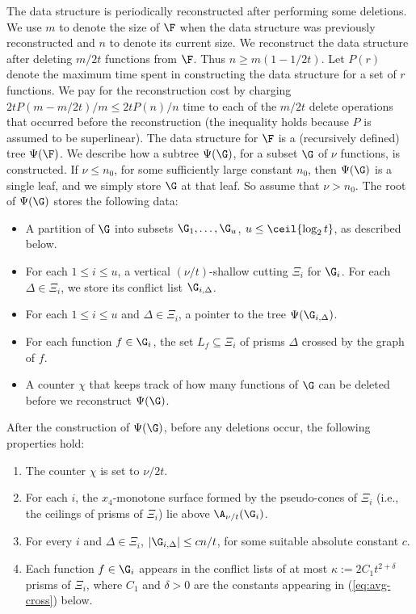 The data structure is periodically reconstructed after performing some deletions. We use 
$m$ to denote the size of $\F$ when the data structure was previously reconstructed and $n$ 
to denote its current size. We reconstruct the data structure after deleting $m/2t$ functions 
from $\F$. Thus $n \ge m(1-1/2t)$. Let $P(r)$ denote the maximum time spent in constructing the 
data structure for a set of $r$ functions. We pay for the reconstruction cost by charging 
$2tP(m-m/2t)/m \le 2tP(n)/n$ time to each of the $m/2t$ delete operations that occurred 
before the reconstruction (the inequality holds because $P$ is assumed to be superlinear). 
The data structure for $\F$ is a (recursively defined) tree $\Psi(\F)$. We describe how a 
subtree $\Psi(\G)$, for a subset $\G$ of $\nu$ functions, is constructed.
%
If $\nu \le n_0$, for some sufficiently large constant $n_0$, then $\Psi(\G)$ is a single
leaf, and we simply store $\G$ at that leaf. So assume that $\nu > n_0$. The root of $\Psi(\G)$ 
stores the following data:
%
\medskip
\begin{itemize}
	\item A partition of $\G$ into subsets $\G_1, \ldots, \G_u$, $u \le \ceil{\log_2 t}$, 
as described below.
	\item For each $1 \le i \le u$, a vertical $(\nu/t)$-shallow cutting 
$\Xi_i$ for $\G_i$. 
For each $\Delta \in \Xi_i$, we store its conflict list $\G_{i,\Delta}$.
	\item For each $1 \le i \le u$ and $\Delta\in\Xi_i$, a pointer to the tree $\Psi(\G_{i,\Delta})$.
	\item For each function $f\in \G_i$, the set $L_f\subseteq\Xi_i$ of prisms $\Delta$
		crossed by the graph of $f$.
	\item A counter $\chi$ that keeps track of how many functions of $\G$ can be deleted before
		we reconstruct $\Psi(\G)$.
\end{itemize}
%
\medskip
After the construction of $\Psi(\G)$, before any deletions occur, the following properties hold:
%
\medskip
\begin{enumerate}[(P1)]
	\item The counter $\chi$ is set to $\nu/2t$.
	\item For each $i$, the $x_4$-monotone surface formed by the pseudo-cones of $\Xi_i$ 
(i.e., the ceilings of prisms of $\Xi_i$) lie above $\A_{\nu/t} (\G_i)$.
	\item For every $i$ and $\Delta\in \Xi_i$, $|\G_{i,\Delta}| \le cn/t$, 
for some suitable absolute constant $c$.
	\item Each function $f\in \G_i$ appears in the conflict lists of at most
    $\kappa := 2C_1t^{2+\delta}$ 
	prisms of $\Xi_i$, where $C_1$ and $\delta>0$ are the constants appearing in
		(\ref{eq:avg-cross}) below.
\end{enumerate}
